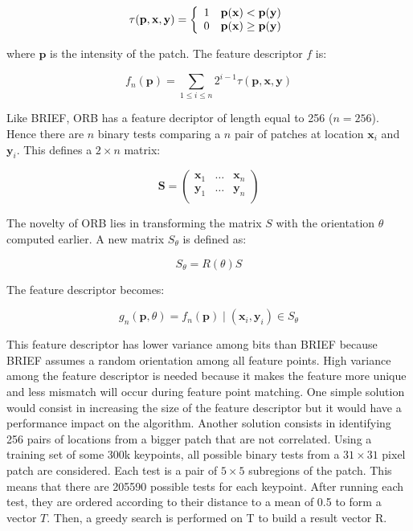 \documentclass[12pt]{article}
\begin{document}
\[
  \tau (\mathbf{p}, \mathbf{x}, \mathbf{y}) =   
\left \{
  \begin{array}{l l}
    1 & \mathbf{p}(\mathbf{x}) < \mathbf{p}(\mathbf{y}) \\
    0 & \mathbf{p}(\mathbf{x}) \geq \mathbf{p}(\mathbf{y}) \\
  \end{array}
  \right .
\]

where $\textbf{p}$ is the intensity of the patch. The feature descriptor $f$ is:

\[
  f_n(\mathbf{p}) = \sum_{1 \leq i \leq n}  2^{i-1} \tau(\mathbf{p}, \mathbf{x}, \mathbf{y})
\]

Like BRIEF, ORB has a feature decriptor of length equal to 256 ($n=256$). Hence there are $n$ binary tests comparing a $n$ pair of patches at location $\mathbf{x}_i$ and $\mathbf{y}_i$. This defines a $2\times n$ matrix:

\[
\mathbf{S} = 
\left ( \begin{matrix} 
\mathbf{x}_1 & \hdots & \mathbf{x}_n \\
\mathbf{y}_1 & \hdots & \mathbf{y}_n \\
\end{matrix} \right )
\]

The novelty of ORB lies in transforming the matrix $S$ with the orientation $\theta$ computed earlier. A new matrix $S_\theta$ is defined as:

\[
  S_\theta = R(\theta)S
\]

The feature descriptor becomes:

\[
  g_n(\mathbf{p}, \theta) = f_n(\mathbf{p}) \mid (\mathbf{x}_i, \mathbf{y}_i) \in S_\theta
\]

This feature descriptor has lower variance among bits than BRIEF because BRIEF assumes a random orientation among all feature points. High variance among the feature descriptor is needed because it makes the feature more unique and less mismatch will occur during feature point matching. One simple solution would consist in increasing the size of the feature descriptor but it would have a performance impact on the algorithm. Another solution consists in identifying 256 pairs of locations from a bigger patch that are not correlated. Using a training set of some 300k keypoints, all possible binary tests from a $31\times 31$ pixel patch are considered. Each test is a pair of $5\times 5$ subregions of the patch. This means that there are 205590 possible tests for each keypoint. After running each test, they are ordered according to their distance to a mean of 0.5 to form a vector $T$. Then, a greedy search is performed on T to build a result vector R.
\end{document}
